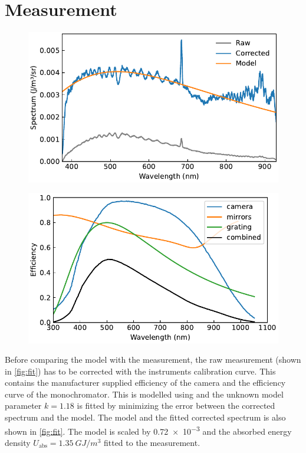 \documentclass[
	a4paper,
]{scrarticle}
\begin{document}
\section{Measurement}
\begin{figure}[h]
    \centering
    \includegraphics{../analysis/figures/combined.fit.pdf}
    \caption{}
    \label{fig:fit}
\end{figure}
\begin{figure}
    \centering
    \includegraphics{../analysis/figures/combined.efficiency.pdf}
    \caption{}
    \label{fig:efficiency}
\end{figure}
Before comparing the model with the measurement, the raw measurement (shown in \autoref{fig:fit}) has to be corrected with the instruments calibration curve.
This contains the manufacturer supplied efficiency of the camera \cite{andorIXonEM897Manual} and the efficiency curve of the monochromator.
This is modelled using \autocite{barkerRippleCorrectionHighdispersion1984} and the unknown model parameter $k=1.18$ is fitted by minimizing the error between the corrected spectrum and the model.
The model and the fitted corrected spectrum is also shown in \autoref{fig:fit}.
The model is scaled by \SI{0.72e-3}{} and the absorbed energy density $U_\text{abs} = \SI{1.35}{GJ/m^3}$ fitted to the measurement.
\end{document}
